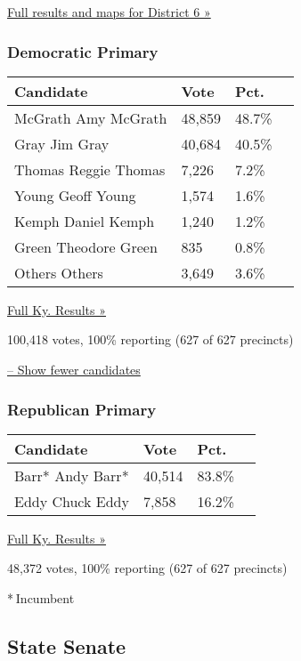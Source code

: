 \href{https://www.nytimes3xbfgragh.onion/elections/results/kentucky-house-district-6-primary-election}{Full
results and maps for District 6 »}

\hypertarget{democratic-primary-5}{%
\subsubsection{Democratic Primary}\label{democratic-primary-5}}

\begin{longtable}[]{@{}llll@{}}
\toprule
Candidate & Vote & Pct. &\tabularnewline
\midrule
\endhead
 McGrath Amy McGrath & 48,859 & 48.7\% &\tabularnewline
 Gray Jim Gray & 40,684 & 40.5\% &\tabularnewline
 Thomas Reggie Thomas & 7,226 & 7.2\% &\tabularnewline
 Young Geoff Young & 1,574 & 1.6\% &\tabularnewline
 Kemph Daniel Kemph & 1,240 & 1.2\% &\tabularnewline
 Green Theodore Green & 835 & 0.8\% &\tabularnewline
 Others Others & 3,649 & 3.6\% &\tabularnewline
\bottomrule
\end{longtable}

\href{https://www.nytimes3xbfgragh.onion/elections/results/kentucky}{Full
Ky. Results »}

100,418 votes, 100\% reporting (627 of 627 precincts)

\protect\hyperlink{}{-- Show fewer candidates}

\hypertarget{republican-primary-5}{%
\subsubsection{Republican Primary}\label{republican-primary-5}}

\begin{longtable}[]{@{}llll@{}}
\toprule
Candidate & Vote & Pct. &\tabularnewline
\midrule
\endhead
 Barr* Andy Barr* & 40,514 & 83.8\% &\tabularnewline
 Eddy Chuck Eddy & 7,858 & 16.2\% &\tabularnewline
\bottomrule
\end{longtable}

\href{https://www.nytimes3xbfgragh.onion/elections/results/kentucky}{Full
Ky. Results »}

48,372 votes, 100\% reporting (627 of 627 precincts)

* Incumbent

\hypertarget{state-senate}{%
\subsection{State Senate}\label{state-senate}}

